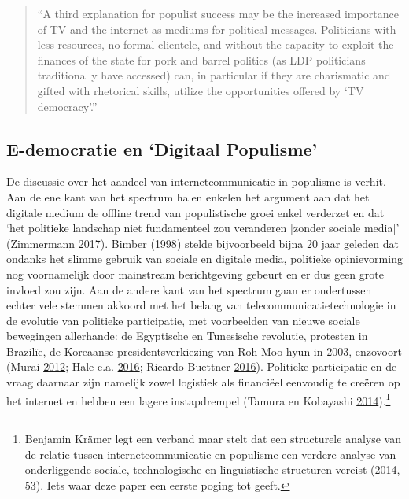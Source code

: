 \documentclass[10.5pt,dutch,]{article}
\begin{document}
\begin{quote}
``A third explanation for populist success may be the increased
importance of TV and the internet as mediums for political messages.
Politicians with less resources, no formal clientele, and without the
capacity to exploit the finances of the state for pork and barrel
politics (as LDP politicians traditionally have accessed) can, in
particular if they are charismatic and gifted with rhetorical skills,
utilize the opportunities offered by `TV democracy'.''
\end{quote}

\subsection{\texorpdfstring{E-democratie en `Digitaal
Populisme'}{E-democratie en Digitaal Populisme}}\label{e-democratie-en-digitaal-populisme}

De discussie over het aandeel van internetcommunicatie in populisme is
verhit. Aan de ene kant van het spectrum halen enkelen het argument aan
dat het digitale medium de offline trend van populistische groei enkel
verderzet en dat `het politieke landschap niet fundamenteel zou
veranderen {[}zonder sociale media{]}' (Zimmermann
\protect\hyperlink{ref-zimmermannux5fdigitalux5f2017}{2017}). Bimber
(\protect\hyperlink{ref-bimberux5finternetux5f1998}{1998}) stelde
bijvoorbeeld bijna 20 jaar geleden dat ondanks het slimme gebruik van
sociale en digitale media, politieke opinievorming nog voornamelijk door
mainstream berichtgeving gebeurt en er dus geen grote invloed zou zijn.
Aan de andere kant van het spectrum gaan er ondertussen echter vele
stemmen akkoord met het belang van telecommunicatietechnologie in de
evolutie van politieke participatie, met voorbeelden van nieuwe sociale
bewegingen allerhande: de Egyptische en Tunesische revolutie, protesten
in Brazilïe, de Koreaanse presidentsverkiezing van Roh Moo-hyun in 2003,
enzovoort (Murai \protect\hyperlink{ref-muraiux5fnetux5f2012}{2012};
Hale e.a. \protect\hyperlink{ref-haleux5fpoliticalux5f2016}{2016};
Ricardo Buettner
\protect\hyperlink{ref-ricardoux5fbuettnerux5fsystematicux5f2016}{2016}).
Politieke participatie en de vraag daarnaar zijn namelijk zowel
logistiek als financiëel eenvoudig te creëren op het internet en hebben
een lagere instapdrempel (Tamura en Kobayashi
\protect\hyperlink{ref-tamuraux5fnigglingux5f2014}{2014}).\footnote{Benjamin
  Krämer legt een verband maar stelt dat een structurele analyse van de
  relatie tussen internetcommunicatie en populisme een verdere analyse
  van onderliggende sociale, technologische en linguistische structuren
  vereist (\protect\hyperlink{ref-kramerux5fmediaux5f2014}{2014}, 53).
  Iets waar deze paper een eerste poging tot geeft.}
\end{document}
